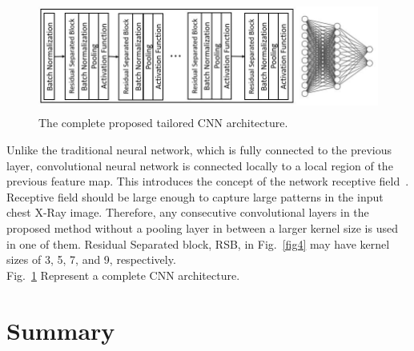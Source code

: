 \begin{figure}
    \begin{center}
    \includegraphics[height=37mm,width=14.0cm]{Figures/fig5.jpg}
    \caption{The complete proposed tailored CNN architecture.}
    \label{fig5}
    \end{center}
    \end{figure}
    
Unlike the traditional neural network, which is fully connected to the previous layer, convolutional neural network is connected locally to a local region of the previous feature map. This introduces the concept of the network receptive field~\cite{luo2016understanding}. Receptive field should be large enough to capture large patterns in the input chest X-Ray image. Therefore, any consecutive convolutional layers in the proposed method without a pooling layer in between a larger kernel size is used in one of them. Residual Separated block, RSB, in Fig.~\ref{fig4} may have kernel sizes of 3, 5, 7, and 9, respectively.\\
Fig.~\ref{fig5} Represent a complete CNN architecture.

\section{Summary}


